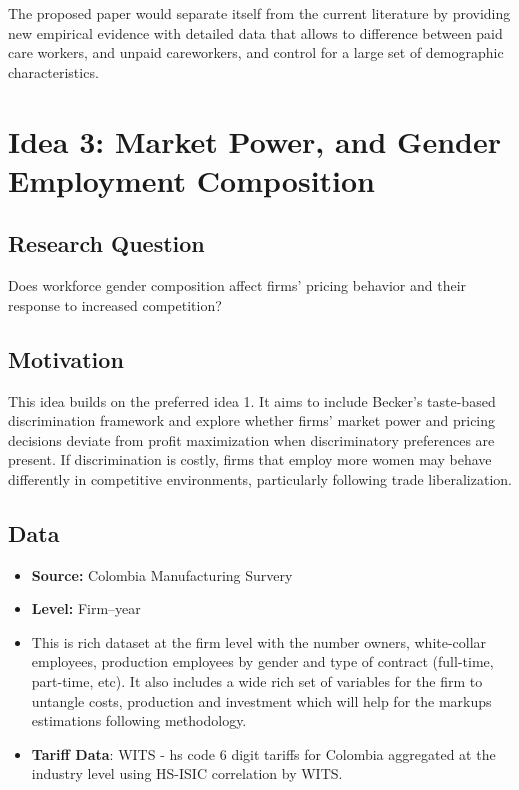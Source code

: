 \documentclass[11pt]{article}
\begin{document}
The proposed paper would separate itself from the current literature by providing new empirical evidence with detailed data that allows to difference between paid care workers, and unpaid careworkers, and control for a large set of demographic characteristics.

\vspace{0.6cm}


\section{Idea 3: Market Power, and Gender Employment Composition}

\subsection*{Research Question}
Does workforce gender composition affect firms' pricing behavior and their response to increased competition?

\subsection*{Motivation}
This idea builds on the preferred idea 1. It aims to include Becker's taste-based discrimination framework and explore whether firms' market power and pricing decisions deviate from profit maximization when discriminatory preferences are present. If discrimination is costly, firms that employ more women may behave differently in competitive environments, particularly following trade liberalization.

\subsection*{Data}
\begin{itemize}[leftmargin=*]
  \item \textbf{Source:} Colombia Manufacturing Survery
  \item \textbf{Level:} Firm--year
  \item {} This is rich dataset at the firm level with the number owners, white-collar employees, production employees by gender and type of contract (full-time, part-time, etc). It also includes a wide rich set of variables for the firm to untangle costs, production and investment which will help for the markups estimations following \cite{loecker_markups_2012} methodology.
  \item \textbf{Tariff Data}: WITS - hs code 6 digit tariffs for Colombia aggregated at the industry level using HS-ISIC correlation by WITS.
\end{itemize}
\end{document}

